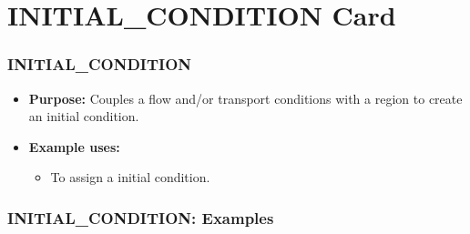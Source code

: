 \section{INITIAL\_CONDITION Card}

\begin{frame}\frametitle{INITIAL\_CONDITION}

\begin{itemize}
\item[] \textbf{Purpose:} Couples a flow and/or transport conditions with a region to create an initial condition.
\item[] \textbf{Example uses:}
\begin{itemize}
  \item To assign a initial condition.
\end{itemize}
\end{itemize}

\end{frame}

\begin{frame}[fragile]\frametitle{INITIAL\_CONDITION: Examples}

\end{frame}
